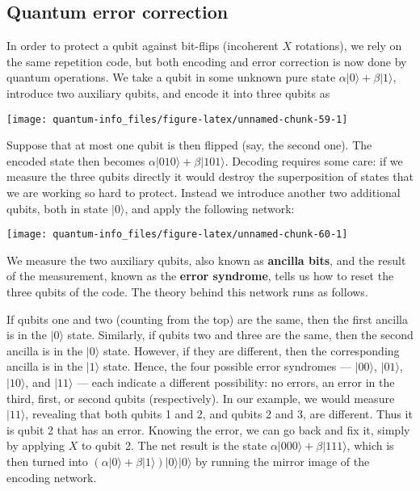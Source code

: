 \documentclass[fleqn]{article}
\begin{document}
\hypertarget{quantum-error-correction}{%
\subsection{Quantum error correction}\label{quantum-error-correction}}

In order to protect a qubit against bit-flips (incoherent \(X\) rotations), we rely on the same repetition code, but both encoding and error correction is now done by quantum operations.
We take a qubit in some unknown pure state \(\alpha|0\rangle + \beta|1\rangle\), introduce two auxiliary qubits, and encode it into three qubits as

\begin{center}\texttt{[image: quantum-info\_files/figure-latex/unnamed-chunk-59-1]} \end{center}

Suppose that at most one qubit is then flipped (say, the second one).
The encoded state then becomes \(\alpha|010\rangle + \beta|101\rangle\).
Decoding requires some care: if we measure the three qubits directly it would destroy the superposition of states that we are working so hard to protect.
Instead we introduce another two additional qubits, both in state \(|0\rangle\), and apply the following network:

\begin{center}\texttt{[image: quantum-info\_files/figure-latex/unnamed-chunk-60-1]} \end{center}

We measure the two auxiliary qubits, also known as \textbf{ancilla bits}, and the result of the measurement, known as the \textbf{error syndrome}, tells us how to reset the three qubits of the code.
The theory behind this network runs as follows.

If qubits one and two (counting from the top) are the same, then the first ancilla is in the \(|0\rangle\) state.
Similarly, if qubits two and three are the same, then the second ancilla is in the \(|0\rangle\) state.
However, if they are different, then the corresponding ancilla is in the \(|1\rangle\) state.
Hence, the four possible error syndromes --- \(|00\rangle\), \(|01\rangle\), \(|10\rangle\), and \(|11\rangle\) --- each indicate a different possibility: no errors, an error in the third, first, or second qubits (respectively).
In our example, we would measure \(|11\rangle\), revealing that both qubits 1 and 2, and qubits 2 and 3, are different.
Thus it is qubit 2 that has an error.
Knowing the error, we can go back and fix it, simply by applying \(X\) to qubit 2.
The net result is the state \(\alpha|000\rangle + \beta|111\rangle\), which is then turned into \((\alpha|0\rangle + \beta|1\rangle)|0\rangle|0\rangle\) by running the mirror image of the encoding network.
\end{document}
